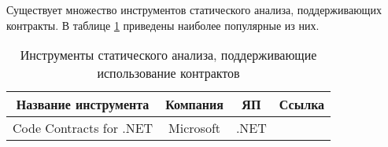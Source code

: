 Существует множество инструментов статического анализа, поддерживающих контракты. В таблице \ref{tab::sai_with_contracts} приведены наиболее популярные из них.

\begin{table}
\caption{Инструменты статического анализа, поддерживающие использование контрактов}
	\begin{center}
		\begin{tabular}{|c|c|c|c|}
		\hline 
		Название инструмента & Компания & ЯП & Ссылка \\ 
		\hline 
		Code Contracts for .NET & Microsoft & .NET & \cite{cccheck} \\ 
		\hline 
		\end{tabular} 
	\end{center}
\label{tab::sai_with_contracts}
\end{table}